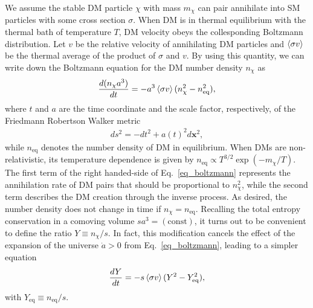 \documentclass[12pt,twoside,book]{article}
\begin{document}
We assume the stable DM particle $\chi$ with mass $m_\chi$ can pair
annihilate into SM particles with some cross section $\sigma$.  When DM
is in thermal equilibrium with the thermal bath of temperature $T$, DM
velocity obeys the collesponding Boltzmann distribution.  Let $v$ be the
relative velocity of annihilating DM particles and $\Braket{\sigma v}$
be the thermal average of the product of $\sigma$ and $v$.  By using
this quantity, we can write down the Boltzmann equation for the DM
number density $n_\chi$ as
\begin{align}
 \frac{d (n_\chi a^3)}{d t} =
 - a^3 \Braket{\sigma v} (n_\chi^2 - n_{\mathrm{eq}}^2),\label{eq_boltzmann}
\end{align}
where $t$ and $a$ are the time coordinate and the scale factor,
respectively, of the Friedmann Robertson Walker metric
\begin{align}
 d s^2 = - d t^2 + a(t)^2 d \bm{x}^2,
\end{align}
while $n_{\mathrm{eq}}$ denotes the number density of DM in equilibrium.
When DMs are non-relativistic, its temperature dependence is given by
$n_{\mathrm{eq}} \propto T^{3/2} \exp \left( -m_\chi / T \right)$.  The
first term of the right handed-side of Eq.~\eqref{eq_boltzmann}
represents the annihilation rate of DM pairs that should be proportional
to $n_\chi^2$, while the second term describes the DM creation through
the inverse process.  As desired, the number density does not change in
time if $n_\chi = n_{\mathrm{eq}}$.  Recalling the total entropy
conservation in a comoving volume $s a^3 = (\mathrm{const})$, it turns
out to be convenient to define the ratio $Y \equiv n_\chi / s$.  In
fact, this modification cancels the effect of the expansion of the
universe $\dot{a} > 0$ from Eq.~\eqref{eq_boltzmann}, leading to a
simpler equation
\begin{align}
 \frac{d Y}{d t} =
 -s \Braket{\sigma v} (Y^2 - Y_{\mathrm{eq}}^2),\label{eq_boltzmann_Yt}
\end{align}
with $Y_{\mathrm{eq}} \equiv n_{\mathrm{eq}} / s$.
\end{document}
